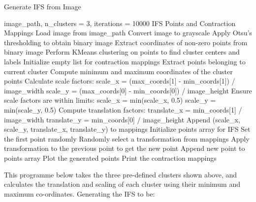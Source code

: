 \documentclass[a4paper,11pt, titlepage]{article}
\theoremstyle{definition}
\theoremstyle{plain}
\theoremstyle{remark}
\theoremstyle{definition}
\begin{document}
\begin{algorithm}[1]
\caption{Generate IFS from Image}
\begin{algorithmic}[1]
\REQUIRE image\_path, n\_clusters = 3, iterations = 10000
\ENSURE IFS Points and Contraction Mappings
\STATE Load image from image\_path
\STATE Convert image to grayscale
\STATE Apply Otsu's thresholding to obtain binary image
\STATE Extract coordinates of non-zero points from binary image
\STATE Perform KMeans clustering on points to find cluster centers and labels
\STATE Initialize empty list for contraction mappings
    \STATE Extract points belonging to current cluster
    \STATE Compute minimum and maximum coordinates of the cluster points
    \STATE Calculate scale factors:
    \STATE \hspace{1em} scale\_x = (max\_coords[1] - min\_coords[1]) / image\_width
    \STATE \hspace{1em} scale\_y = (max\_coords[0] - min\_coords[0]) / image\_height
    \STATE Ensure scale factors are within limits:
    \STATE \hspace{1em} scale\_x = min(scale\_x, 0.5)
    \STATE \hspace{1em} scale\_y = min(scale\_y, 0.5)
    \STATE Compute translation factors:
    \STATE \hspace{1em} translate\_x = min\_coords[1] / image\_width
    \STATE \hspace{1em} translate\_y = min\_coords[0] / image\_height
    \STATE Append (scale\_x, scale\_y, translate\_x, translate\_y) to mappings
\ENDFOR
\STATE Initialize points array for IFS
\STATE Set the first point randomly
    \STATE Randomly select a transformation from mappings
    \STATE Apply transformation to the previous point to get the new point
    \STATE Append new point to points array
\ENDFOR
\STATE Plot the generated points
\STATE Print the contraction mappings

\end{algorithmic}
\end{algorithm}

This programme below takes the three pre-defined clusters shown above, and calculates the translation and scaling of each cluster using their minimum and maximum co-ordinates. Generating the IFS to be:
\end{document}
